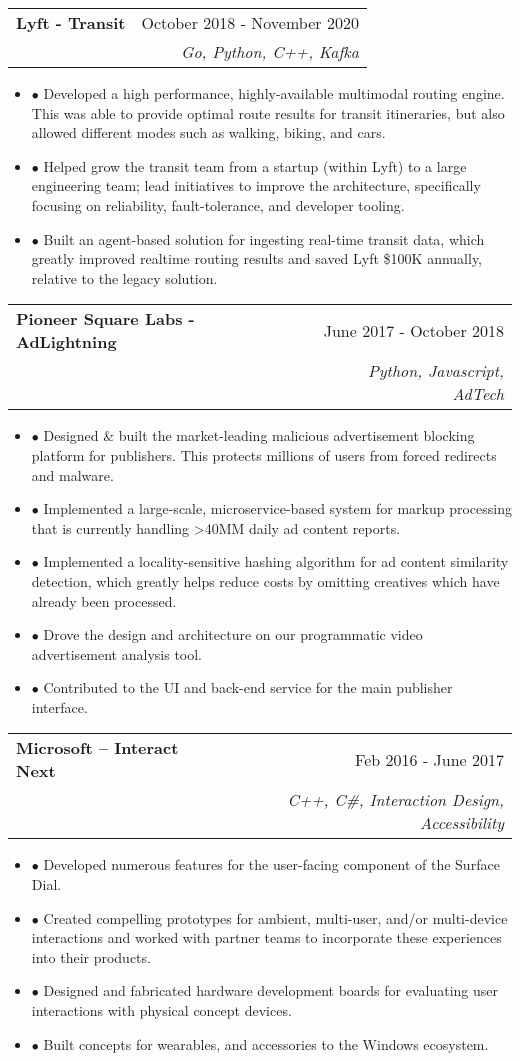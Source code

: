 \documentclass[a4paper,11pt]{article}
\makeatletter
\newcommand{\resumeExp}[4]{
\vspace{0mm}\item[]
    \begin{tabular*}{\textwidth}[t]{l@{\extracolsep{\fill}}r}
        \hspace{-4.4mm} \small\textbf{#1} & {\footnotesize{#3}}\vspace{-1.2mm}\\
        \hspace{-4.3mm} \footnotesize{\text{#2}} & \footnotesize{\textit{#4}}
    \end{tabular*}
    \vspace{-6.1mm}
}
\newcommand{\resumeItemListStart}{\begin{justify}\begin{itemize}[leftmargin=3ex, rightmargin=2ex, noitemsep,labelsep=1.2mm,itemsep=0mm]\small}
\newcommand{\resumeItemListEnd}{\end{itemize}\end{justify}\vspace{1.5mm}}
\makeatother
\begin{document}
\resumeExp
{Lyft - Transit}
{Senior Software Engineer}
{October 2018 - November 2020}
{Go, Python, C++, Kafka}
\resumeItemListStart
\item[$\bullet$] Developed a high performance, highly-available multimodal routing engine. This was able to provide optimal route results for transit itineraries, but also allowed different modes such as walking, biking, and cars.
\item[$\bullet$] Helped grow the transit team from a startup (within Lyft) to a large engineering team; lead initiatives to improve the architecture, specifically focusing on reliability, fault-tolerance, and developer tooling.
\item[$\bullet$] Built an agent-based solution for ingesting real-time transit data, which greatly improved realtime routing results and saved Lyft \$100K annually, relative to the legacy solution.
\resumeItemListEnd


\resumeExp
{Pioneer Square Labs - AdLightning}
{Senior Software Engineer}
{June 2017 - October 2018}
{Python, Javascript, AdTech}
\resumeItemListStart
\item[$\bullet$] Designed \& built the market-leading malicious advertisement blocking platform for publishers. This protects millions of users from forced redirects and malware.
\item[$\bullet$] Implemented a large-scale, microservice-based system for markup processing that is currently handling >40MM daily ad content reports.
\item[$\bullet$] Implemented a locality-sensitive hashing algorithm for ad content similarity detection, which greatly helps reduce costs by omitting creatives which have already been processed.
\item[$\bullet$] Drove the design and architecture on our programmatic video advertisement analysis tool.
\item[$\bullet$] Contributed to the UI and back-end service for the main publisher interface.
\resumeItemListEnd


\resumeExp
{Microsoft – Interact Next}
{SDE II}
{Feb 2016 - June 2017}
{C++, C\#, Interaction Design, Accessibility}
\resumeItemListStart
\item[$\bullet$] Developed numerous features for the user-facing component of the Surface Dial.
\item[$\bullet$] Created compelling prototypes for ambient, multi-user, and/or multi-device interactions and worked with partner teams to incorporate these experiences into their products.
\item[$\bullet$] Designed and fabricated hardware development boards for evaluating user interactions with physical concept devices.
\item[$\bullet$] Built concepts for wearables, and accessories to the Windows ecosystem.
\resumeItemListEnd
\end{document}
